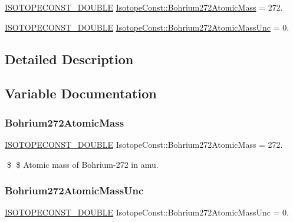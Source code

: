 \begin{DoxyCompactItemize}
\item 
\mbox{\hyperlink{group___isotope_const-_macros_ga8f45a7272ce02c0b4c65c44636ed719a}{I\+S\+O\+T\+O\+P\+E\+C\+O\+N\+S\+T\+\_\+\+D\+O\+U\+B\+LE}} \mbox{\hyperlink{group___isotope_const-_bohrium-_bh272_ga4b9c8c21322fe86c73eaa2dffaf488eb}{Isotope\+Const\+::\+Bohrium272\+Atomic\+Mass}} = 272.
\item 
\mbox{\hyperlink{group___isotope_const-_macros_ga8f45a7272ce02c0b4c65c44636ed719a}{I\+S\+O\+T\+O\+P\+E\+C\+O\+N\+S\+T\+\_\+\+D\+O\+U\+B\+LE}} \mbox{\hyperlink{group___isotope_const-_bohrium-_bh272_ga3b083fad7ec9c6fee49ab3fb2918c883}{Isotope\+Const\+::\+Bohrium272\+Atomic\+Mass\+Unc}} = 0.
\end{DoxyCompactItemize}


\subsection{Detailed Description}


\subsection{Variable Documentation}
\mbox{\label{group___isotope_const-_bohrium-_bh272_ga4b9c8c21322fe86c73eaa2dffaf488eb}} 
\subsubsection{\texorpdfstring{Bohrium272\+Atomic\+Mass}{Bohrium272AtomicMass}}
{\footnotesize\ttfamily \mbox{\hyperlink{group___isotope_const-_macros_ga8f45a7272ce02c0b4c65c44636ed719a}{I\+S\+O\+T\+O\+P\+E\+C\+O\+N\+S\+T\+\_\+\+D\+O\+U\+B\+LE}} Isotope\+Const\+::\+Bohrium272\+Atomic\+Mass = 272.}

\$ \$ Atomic mass of Bohrium-\/272 in amu. \mbox{\label{group___isotope_const-_bohrium-_bh272_ga3b083fad7ec9c6fee49ab3fb2918c883}} 
\subsubsection{\texorpdfstring{Bohrium272\+Atomic\+Mass\+Unc}{Bohrium272AtomicMassUnc}}
{\footnotesize\ttfamily \mbox{\hyperlink{group___isotope_const-_macros_ga8f45a7272ce02c0b4c65c44636ed719a}{I\+S\+O\+T\+O\+P\+E\+C\+O\+N\+S\+T\+\_\+\+D\+O\+U\+B\+LE}} Isotope\+Const\+::\+Bohrium272\+Atomic\+Mass\+Unc = 0.}

